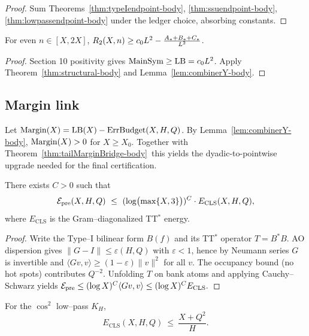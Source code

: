 \begin{proof}
Sum Theorems~\ref{thm:typeIendpoint-body}, \ref{thm:ssuendpoint-body}, \ref{thm:lowpassendpoint-body} under the ledger choice, absorbing constants.
\end{proof}

\begin{theorem}\label{thm:dyadicLB-body}
For even \(n\in[X,2X]\), \(R_2(X,n)\ge c_0 L^2-\frac{A_*+B_*+C_*}{L^2}\).
\end{theorem}

\begin{proof}
Section 10 positivity gives \(\operatorname{MainSym}\ge \operatorname{LB}=c_0 L^2\). Apply Theorem~\ref{thm:structural-body} and Lemma~\ref{lem:combinerY-body}.
\end{proof}

\subsection*{Margin link}
Let \(\operatorname{Margin}(X)=\operatorname{LB}(X)-\operatorname{ErrBudget}(X,H,Q)\).
By Lemma~\ref{lem:combinerY-body}, \(\operatorname{Margin}(X)>0\) for \(X\ge X_0\).
Together with Theorem~\ref{thm:tailMarginBridge-body}\, this yields the dyadic-to-pointwise upgrade needed for the final certification.

\begin{lemma}\label{lem:Y.preErr.to.CLS}
There exists $C>0$ such that
\[
  \PreErrTypeI(X,H,Q)\ \le\ (\log(\max\{X,3\}))^{C}\cdot E_{\mathrm{CLS}}(X,H,Q),
\]
where $E_{\mathrm{CLS}}$ is the Gram–diagonalized TT$^\ast$ energy.
\end{lemma}

\begin{proof}
Write the Type–I bilinear form $B(f)$ and its TT$^\ast$ operator $T=B^\ast B$.
AO dispersion gives $\|G-I\|\le \varepsilon(H,Q)$ with $\varepsilon<1$, hence by Neumann series
$G$ is invertible and $\langle Gv,v\rangle\ge (1-\varepsilon)\|v\|^2$ for all $v$.
The occupancy bound (no hot spots) contributes $Q^{-2}$. Unfolding $T$ on bank atoms
and applying Cauchy–Schwarz yields
\(
  \mathcal{E}_{\mathrm{pre}} \le (\log X)^{C}\langle Gv,v\rangle
   \le (\log X)^{C} E_{\mathrm{CLS}}.
\)
\end{proof}

\begin{lemma}\label{lem:Y.KH.lowpass}
For the $\cos^2$ low–pass $K_H$,
\[
  E_{\mathrm{CLS}}(X,H,Q)\ \le\ \frac{X+Q^2}{H}.
\]
\end{lemma}

